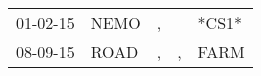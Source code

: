 \begin{supertabular}{p{0.07\textwidth}p{0.06\textwidth}p{0.02\textwidth}p{0.02\textwidth}p{0.06\textwidth}}
 01-02-15\textsuperscript{} &  NEMO\textsuperscript{} &  , &    &                   *CS1* \\
 08-09-15\textsuperscript{} &  ROAD\textsuperscript{} &  , &  , &  FARM\textsuperscript{} \\
\end{supertabular}

